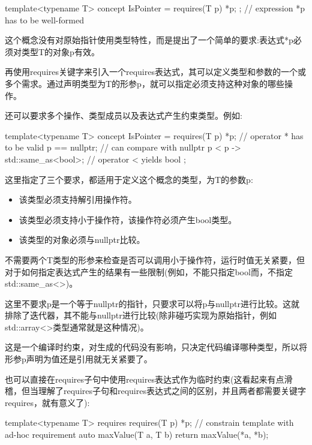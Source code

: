 \begin{cpp}
template<typename T>
concept IsPointer = requires(T p) { *p; }; // expression *p has to be well-formed
\end{cpp}

这个概念没有对原始指针使用类型特性，而是提出了一个简单的要求:表达式*p必须对类型T的对象p有效。

再使用requires关键字来引入一个requires表达式，其可以定义类型和参数的一个或多个需求。通过声明类型为T的形参p，就可以指定必须支持这种对象的哪些操作。

还可以要求多个操作、类型成员以及表达式产生约束类型。例如:

\begin{cpp}
template<typename T>
concept IsPointer = requires(T p) {
	*p; // operator * has to be valid
	p == nullptr; // can compare with nullptr
	{p < p} -> std::same_as<bool>; // operator < yields bool
};
\end{cpp}

这里指定了三个要求，都适用于定义这个概念的类型，为T的参数p:

\begin{itemize}
\item
该类型必须支持解引用操作符。

\item
该类型必须支持小于操作符，该操作符必须产生bool类型。

\item
该类型的对象必须与nullptr比较。
\end{itemize}

不需要两个T类型的形参来检查是否可以调用小于操作符，运行时值无关紧要，但对于如何指定表达式产生的结果有一些限制(例如，不能只指定bool而，不指定std::same\_as<>)。

这里不要求p是一个等于nullptr的指针，只要求可以将p与nullptr进行比较。这就排除了迭代器，其不能与nullptr进行比较(除非碰巧实现为原始指针，例如std::array<>类型通常就是这种情况)。

这是一个编译时约束，对生成的代码没有影响，只决定代码编译哪种类型，所以将形参p声明为值还是引用就无关紧要了。

也可以直接在requires子句中使用requires表达式作为临时约束(这看起来有点滑稽，但当理解了requires子句和requires表达式之间的区别，并且两者都需要关键字requires，就有意义了):

\begin{cpp}
template<typename T>
requires requires(T p) { *p; } // constrain template with ad-hoc requirement
auto maxValue(T a, T b)
{
	return maxValue(*a, *b);
}
\end{cpp}


